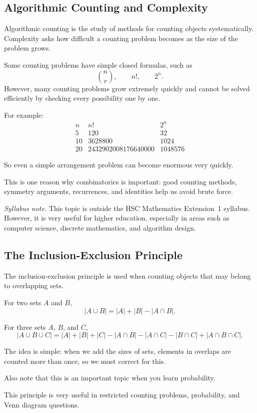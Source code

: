 \documentclass[12pt]{article}
\begin{document}
\subsection{Algorithmic Counting and Complexity}
Algorithmic counting is the study of methods for counting objects systematically. Complexity asks how difficult a counting problem becomes as the size of the problem grows.

Some counting problems have simple closed formulas, such as
\[
\binom{n}{r},\qquad n!,\qquad 2^n.
\]
However, many counting problems grow extremely quickly and cannot be solved efficiently by checking every possibility one by one.

For example:
\[
\begin{array}{c|c|c}
n & n! & 2^n \\ \hline
5 & 120 & 32 \\
10 & 3628800 & 1024 \\
20 & 2432902008176640000 & 1048576
\end{array}
\]

So even a simple arrangement problem can become enormous very quickly.

This is one reason why combinatorics is important: good counting methods, symmetry arguments, recurrences, and identities help us avoid brute force.

\textit{Syllabus note.} This topic is outside the HSC Mathematics Extension~1 syllabus. However, it is very useful for higher education, especially in areas such as computer science, discrete mathematics, and algorithm design.

\subsection{The Inclusion-Exclusion Principle}
The inclusion-exclusion principle is used when counting objects that may belong to overlapping sets.

For two sets $A$ and $B$,
\[
|A\cup B|=|A|+|B|-|A\cap B|.
\]

For three sets $A$, $B$, and $C$,
\[
|A\cup B\cup C|
=
|A|+|B|+|C|
-|A\cap B|-|A\cap C|-|B\cap C|
+|A\cap B\cap C|.
\]

The idea is simple: when we add the sizes of sets, elements in overlaps are counted more than once, so we must correct for this.

Also note that this is an important topic when you learn probability.

This principle is very useful in restricted counting problems, probability, and Venn diagram questions.
\end{document}
